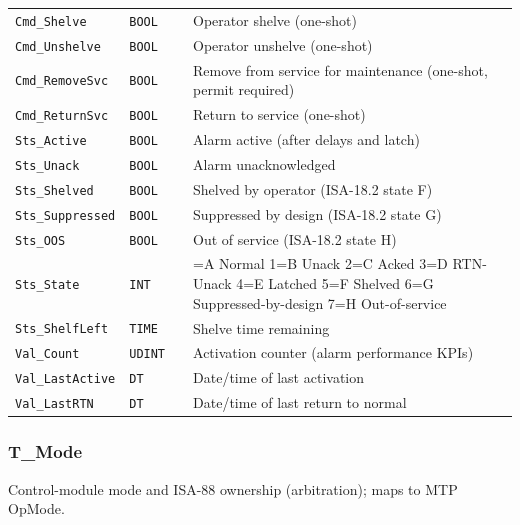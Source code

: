 {\begin{longtable}{@{}>{\raggedright\arraybackslash}p{3.4cm}>{\raggedright\arraybackslash}p{3.3cm}>{\raggedright\arraybackslash}p{1.3cm}>{\raggedright\arraybackslash}p{6.4cm}@{}}
\texttt{Cmd\_Shelve} & \texttt{BOOL} &  & Operator shelve (one-shot) \\
\texttt{Cmd\_Unshelve} & \texttt{BOOL} &  & Operator unshelve (one-shot) \\
\texttt{Cmd\_RemoveSvc} & \texttt{BOOL} &  & Remove from service for maintenance (one-shot, permit required) \\
\texttt{Cmd\_ReturnSvc} & \texttt{BOOL} &  & Return to service (one-shot) \\
\texttt{Sts\_Active} & \texttt{BOOL} &  & Alarm active (after delays and latch) \\
\texttt{Sts\_Unack} & \texttt{BOOL} &  & Alarm unacknowledged \\
\texttt{Sts\_Shelved} & \texttt{BOOL} &  & Shelved by operator (ISA-18.2 state F) \\
\texttt{Sts\_Suppressed} & \texttt{BOOL} &  & Suppressed by design (ISA-18.2 state G) \\
\texttt{Sts\_OOS} & \texttt{BOOL} &  & Out of service (ISA-18.2 state H) \\
\texttt{Sts\_State} & \texttt{INT} &  & 0=A Normal 1=B Unack 2=C Acked 3=D RTN-Unack 4=E Latched 5=F Shelved 6=G Suppressed-by-design 7=H Out-of-service \\
\texttt{Sts\_ShelfLeft} & \texttt{TIME} &  & Shelve time remaining \\
\texttt{Val\_Count} & \texttt{UDINT} &  & Activation counter (alarm performance KPIs) \\
\texttt{Val\_LastActive} & \texttt{DT} &  & Date/\allowbreak{}time of last activation \\
\texttt{Val\_LastRTN} & \texttt{DT} &  & Date/\allowbreak{}time of last return to normal \\
\bottomrule
\end{longtable}
}
\subsubsection*{T\_Mode}
\label{app:pclib:tmode}
Control-module mode and ISA-88 ownership (arbitration); maps to MTP OpMode.

